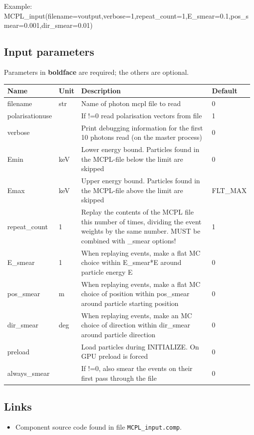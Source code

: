 Example: MCPL\_input(filename=voutput,verbose=1,repeat\_count=1,E\_smear=0.1,pos\_smear=0.001,dir\_smear=0.01)

\subsection*{Input parameters}
Parameters in \textbf{boldface} are required; the others are optional.

\begin{longtable}{p{}p{}p{}p{}}
\toprule
\textbf{Name} & \textbf{Unit} & \textbf{Description} & \textbf{Default} \\
\midrule
\endhead
filename & str & Name of photon mcpl file to read & 0 \\
polarisationuse &   & If !=0 read polarisation vectors from file & 1 \\
verbose &   & Print debugging information for the first 10 photons read (on the master process) & 0 \\
Emin & keV & Lower energy bound. Particles found in the MCPL-file below the limit are skipped & 0 \\
Emax & keV & Upper energy bound. Particles found in the MCPL-file above the limit are skipped & FLT\_MAX \\
repeat\_count & 1 & Replay the contents of the MCPL file this number of times, dividing the event weights by the same number. MUST be combined with \_smear options! & 1 \\
E\_smear & 1 & When replaying events, make a flat MC choice within E\_smear*E around particle energy E & 0 \\
pos\_smear & m & When replaying events, make a flat MC choice of position within pos\_smear around particle starting position & 0 \\
dir\_smear & deg & When replaying events, make an MC choice of direction within dir\_smear around particle direction & 0 \\
preload &   & Load particles during INITIALIZE. On GPU preload is forced & 0 \\
always\_smear &   & If !=0, also smear the events on their first pass through the file & 0 \\
\bottomrule
\end{longtable}

\subsection*{Links}
\begin{itemize}
  \item Component source code found in file \texttt{MCPL\_input.comp}.
\end{itemize}

